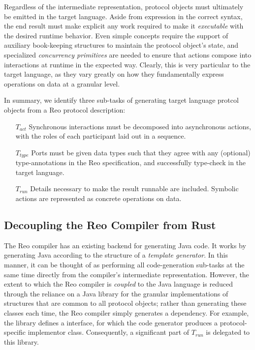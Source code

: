 Regardless of the intermediate representation, protocol objects must ultimately be emitted in the target language. Aside from expression in the correct syntax, the end result must make explicit any work required to make it \textit{executable} with the desired runtime behavior. Even simple concepts require the support of auxiliary book-keeping structures to maintain the protocol object's state, and specialized \textit{concurrency primitives} are needed to ensure that actions compose into interactions at runtime in the expected way. Clearly, this is very particular to the target language, as they vary greatly on how they fundamentally express operations on data at a granular level.

In summary, we identify three sub-tasks of generating target language protcol objects from a Reo protocol description:
\begin{itemize}
	\item [$T_{act}$] Synchronous interactions must be decomposed into asynchronous actions, with the roles of each participant laid out in a sequence.
	\item [$T_{type}$] Ports must be given data types such that they agree with any (optional) type-annotations in the Reo specification, and successfully type-check in the target language.
	\item [$T_{run}$] Details necessary to make the result runnable are included. Symbolic actions are represented as concrete operations on data.
\end{itemize}


\subsection{Decoupling the Reo Compiler from Rust}
The Reo compiler has an existing backend for generating Java code. It works by generating Java according to the structure of a \textit{template generator}. In this manner, it can be thought of as performing all code-generation sub-tasks at the same time directly from the compiler's intermediate representation. However, the extent to which the Reo compiler is \textit{coupled} to the Java language is reduced through the reliance on a Java library for the granular implementations of structures that are common to all protocol objects; rather than generating these classes each time, the Reo compiler simply generates a dependency. For example, the library defines a  interface, for which the code generator produces a protocol-specific implementor class. Consequently, a significant part of $T_{run}$ is delegated to this library.

